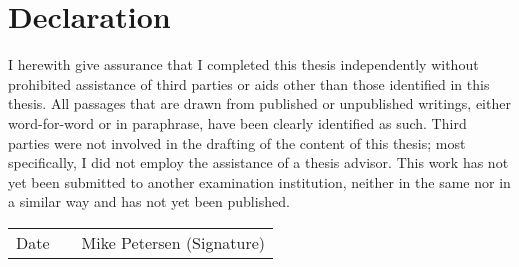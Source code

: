 \documentclass[../main.tex]{subfiles}
\begin{document}
\section*{Declaration}

I herewith give assurance that I completed this thesis independently without prohibited assistance of third parties or aids other than those identified in this thesis. All passages that are drawn from published or unpublished writings, either word-for-word or in paraphrase, have been clearly identified as such. Third parties were not involved in the drafting of the content of this thesis; most specifically, I did not employ the assistance of a thesis advisor. This work has not yet been submitted to another examination institution, neither in the same nor in a similar way and has not yet been published.

\vspace{1in}
\centering
\begin{tabular}{>{\centering\arraybackslash}p{3cm}p{4cm}>{\centering\arraybackslash}p{5cm}} 
    \cmidrule{1-1}\cmidrule{3-3}
    Date &  & Mike Petersen (Signature) 
    \end{tabular}
\clearpage
\end{document}
